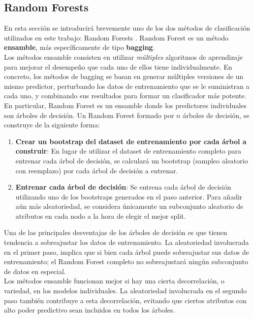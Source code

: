 \subsection{Random Forests}

En esta sección se introducirá brevemente uno de los dos métodos de clasificación utilizados en este trabajo: Random Forests \cite{rf}. Random Forest es un método \textbf{ensamble}, más específicamente de tipo \textbf{bagging}. \\

Los métodos ensamble consisten en utilizar \textit{múltiples} algoritmos de aprendizaje para mejorar el desempeño que cada uno de ellos tiene individualmente. En concreto, los métodos de bagging \cite{bagging} se basan en generar múltiples versiones de un mismo predictor, perturbando los datos de entrenamiento que se le suministran a cada uno, y combinando sus resultados para formar un clasificador más potente. \\

En particular, Random Forest es un ensamble donde los predictores individuales son árboles de decisión. Un Random Forest formado por $n$ árboles de decisión, se construye de la siguiente forma:

\begin{enumerate}
\item \textbf{Crear un bootstrap del dataset de entrenamiento por cada árbol a construir}: En lugar de utilizar el dataset de entrenamiento completo para entrenar cada árbol de decisión, se calculará un bootstrap (sampleo aleatorio con reemplazo) por cada árbol de decisión a entrenar. 
\item \textbf{Entrenar cada árbol de decisión}: Se entrena cada árbol de decisión utilizando uno de los bootstraps generados en el paso anterior. Para añadir aún más aleatoriedad, se considera únicamente un subconjunto aleatorio de atributos en cada nodo a la hora de elegir el mejor split.
\end{enumerate}

Una de las principales desventajas de los árboles de decisión es que tienen tendencia a sobreajustar los datos de entrenamiento. La aleatoriedad involucrada en el primer paso, implica que si bien cada árbol puede sobreajustar sus datos de entrenamiento; el Random Forest completo no sobreajustará ningún subconjunto de datos en especial. \\

Los métodos ensamble funcionan mejor si hay una cierta decorrelación, o variedad, en los modelos individuales. La aleatoriedad involucrada en el segundo paso también contribuye a esta decorrelación, evitando que ciertos atributos con alto poder predictivo sean incluidos en todos los árboles. \\

